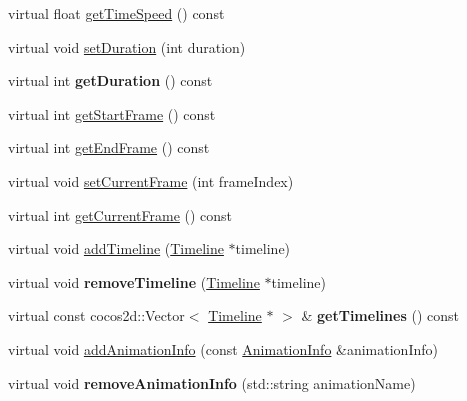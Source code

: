 \begin{DoxyCompactItemize}
\item 
virtual float \hyperlink{classActionTimeline_a290ee51f489337c15119fdef29005cf9}{get\+Time\+Speed} () const
\item 
virtual void \hyperlink{classActionTimeline_ab1e49839f767641b62e2a450269fb5b8}{set\+Duration} (int duration)
\item 
\mbox{\label{classActionTimeline_abf818d6b1e6013f8878007f2d485dd42}} 
virtual int {\bfseries get\+Duration} () const
\item 
virtual int \hyperlink{classActionTimeline_a5697337196c4138ac004d88f88e38f5e}{get\+Start\+Frame} () const
\item 
virtual int \hyperlink{classActionTimeline_a1bdee13b0de8081126528d2f7f4e1479}{get\+End\+Frame} () const
\item 
virtual void \hyperlink{classActionTimeline_aee2a888d66f69abb18e550cbfa3d9358}{set\+Current\+Frame} (int frame\+Index)
\item 
virtual int \hyperlink{classActionTimeline_a63469259c3007a0a25eafed675ab3e86}{get\+Current\+Frame} () const
\item 
virtual void \hyperlink{classActionTimeline_a6a7802cf8d21d6dc683a5b2c666ae446}{add\+Timeline} (\hyperlink{classTimeline}{Timeline} $\ast$timeline)
\item 
\mbox{\label{classActionTimeline_aadf8138d03142579a07e36974177362c}} 
virtual void {\bfseries remove\+Timeline} (\hyperlink{classTimeline}{Timeline} $\ast$timeline)
\item 
\mbox{\label{classActionTimeline_ac7c643312a8e6ffd450443d4fd8853aa}} 
virtual const cocos2d\+::\+Vector$<$ \hyperlink{classTimeline}{Timeline} $\ast$ $>$ \& {\bfseries get\+Timelines} () const
\item 
virtual void \hyperlink{classActionTimeline_a9cc3878cb36ff61e9da9351163dcd004}{add\+Animation\+Info} (const \hyperlink{structAnimationInfo}{Animation\+Info} \&animation\+Info)
\item 
\mbox{\label{classActionTimeline_a5a1ce651b5aff14197d5dba3bec05a1d}} 
virtual void {\bfseries remove\+Animation\+Info} (std\+::string animation\+Name)
\item 
\mbox{\label{classActionTimeline_ab70ee0632147fdbdcbf1db04912d8792}} 

\end{DoxyCompactItemize}
